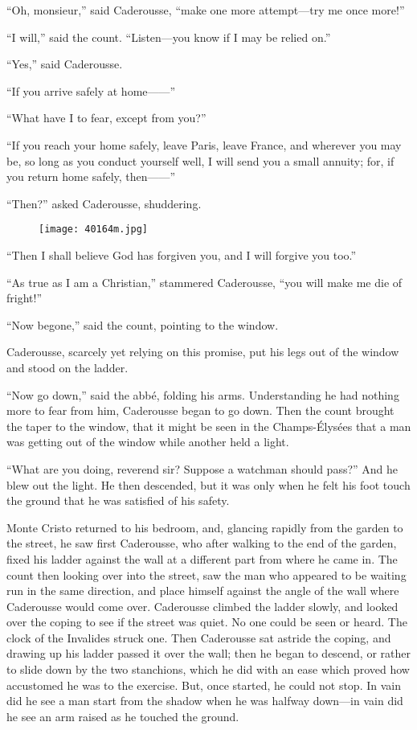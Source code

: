 “Oh, monsieur,” said Caderousse, “make one more attempt—try me once
more!”

“I will,” said the count. “Listen—you know if I may be relied on.”

“Yes,” said Caderousse.

“If you arrive safely at home——”

“What have I to fear, except from you?”

“If you reach your home safely, leave Paris, leave France, and wherever
you may be, so long as you conduct yourself well, I will send you a
small annuity; for, if you return home safely, then——”

“Then?” asked Caderousse, shuddering.

\begin{figure}[ht]
\texttt{[image: 40164m.jpg]}
\end{figure}

“Then I shall believe God has forgiven you, and I will forgive you
too.”

“As true as I am a Christian,” stammered Caderousse, “you will make me
die of fright!”

“Now begone,” said the count, pointing to the window.

Caderousse, scarcely yet relying on this promise, put his legs out of
the window and stood on the ladder.

“Now go down,” said the abbé, folding his arms. Understanding he had
nothing more to fear from him, Caderousse began to go down. Then the
count brought the taper to the window, that it might be seen in the
Champs-Élysées that a man was getting out of the window while another
held a light.

“What are you doing, reverend sir? Suppose a watchman should pass?” And
he blew out the light. He then descended, but it was only when he felt
his foot touch the ground that he was satisfied of his safety.

Monte Cristo returned to his bedroom, and, glancing rapidly from the
garden to the street, he saw first Caderousse, who after walking to the
end of the garden, fixed his ladder against the wall at a different
part from where he came in. The count then looking over into the
street, saw the man who appeared to be waiting run in the same
direction, and place himself against the angle of the wall where
Caderousse would come over. Caderousse climbed the ladder slowly, and
looked over the coping to see if the street was quiet. No one could be
seen or heard. The clock of the Invalides struck one. Then Caderousse
sat astride the coping, and drawing up his ladder passed it over the
wall; then he began to descend, or rather to slide down by the two
stanchions, which he did with an ease which proved how accustomed he
was to the exercise. But, once started, he could not stop. In vain did
he see a man start from the shadow when he was halfway down—in vain did
he see an arm raised as he touched the ground.

